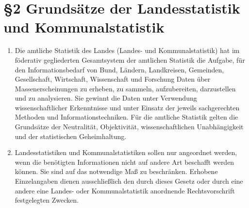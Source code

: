     \section[\S2 Grundsätze]{\S2 Grundsätze der Landesstatistik und Kommunalstatistik}
        \begin{enumerate}[label=(\arabic*)]
            \item Die amtliche Statistik des Landes (Landes- und Kommunalstatistik) hat im föderativ gegliederten Gesamtsystem der amtlichen Statistik die Aufgabe, für den Informationsbedarf von Bund, Ländern, Landkreisen, Gemeinden, Gesellschaft, Wirtschaft, Wissenschaft und Forschung Daten über Massenerscheinungen zu erheben, zu sammeln, aufzubereiten, darzustellen und zu analysieren. Sie gewinnt die Daten unter Verwendung wissenschaftlicher Erkenntnisse und unter Einsatz der jeweils sachgerechten Methoden und Informationstechniken. Für die amtliche Statistik gelten die Grundsätze der Neutralität, Objektivität, wissenschaftlichen Unabhängigkeit und der statistischen Geheimhaltung.
            \item Landesstatistiken und Kommunalstatistiken sollen nur angeordnet werden, wenn die benötigten Informationen nicht auf andere Art beschafft werden können. Sie sind auf das notwendige Maß zu beschränken. Erhobene Einzelangaben dienen ausschließlich den durch dieses Gesetz oder durch eine andere eine Landes- oder Kommunalstatistik anordnende Rechtsvorschrift festgelegten Zwecken.
        \end{enumerate}


